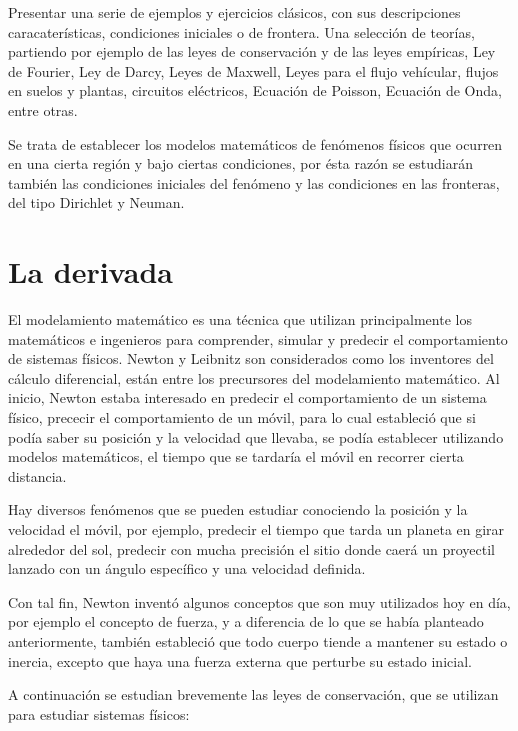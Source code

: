 Presentar una serie de ejemplos y ejercicios clásicos, con sus descripciones
caracaterísticas, condiciones iniciales o de frontera.  Una selección 
de teorías, partiendo por ejemplo de las leyes de conservación y de las 
leyes empíricas, Ley de Fourier, Ley de Darcy, Leyes de Maxwell, Leyes 
para el flujo vehícular, flujos en suelos y plantas, circuitos eléctricos,
Ecuación de Poisson, Ecuación de Onda, entre otras.

Se trata de establecer los modelos matemáticos de fenómenos físicos que ocurren en una cierta región
y bajo ciertas condiciones, por ésta razón se estudiarán también las condiciones iniciales del 
fenómeno y las condiciones en las  fronteras, del tipo Dirichlet y Neuman.

\section{La derivada}
El modelamiento matemático es una técnica que utilizan principalmente los matemáticos e ingenieros 
para comprender, simular y predecir el comportamiento de sistemas físicos.  Newton y Leibnitz 
son considerados como los inventores del cálculo diferencial, están entre los precursores del modelamiento matemático.
Al inicio, Newton estaba interesado en predecir el comportamiento de un sistema físico, prececir el comportamiento 
de un móvil, para lo cual estableció que si podía saber su posición y la velocidad que llevaba, se podía establecer
utilizando modelos matemáticos, el tiempo que se tardaría el móvil en recorrer cierta distancia.

Hay diversos fenómenos que se pueden estudiar conociendo la posición y la velocidad el móvil, por ejemplo, 
predecir el tiempo que tarda un planeta en girar alrededor del sol, predecir con mucha precisión el sitio donde caerá un
proyectil lanzado con un ángulo específico y una velocidad definida.  

Con tal fin, Newton inventó algunos conceptos que son muy utilizados hoy en día, 
por ejemplo el concepto de fuerza, y a diferencia de lo que se había planteado
anteriormente, también estableció que todo cuerpo tiende a mantener su estado o inercia, excepto que haya una
fuerza externa que perturbe su estado inicial.  

A continuación se estudian brevemente las leyes de conservación, que se utilizan para estudiar sistemas físicos:

